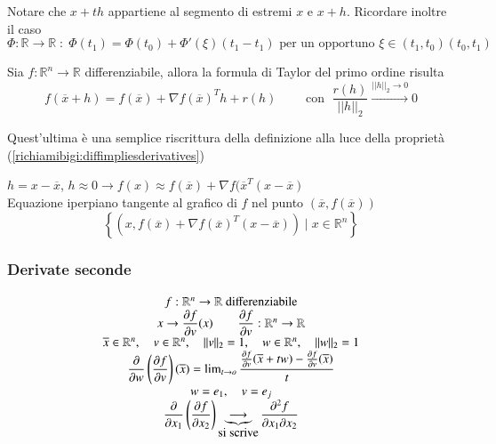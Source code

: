 \begin{notes}
Notare che $x + th$ appartiene al segmento di estremi $x$ e $x+h$.
Ricordare inoltre il caso
$$  \Phi : \mathbb{R} \rightarrow \mathbb{R}\; : \;
\Phi(t_1) = \Phi(t_0) +   \Phi'(\xi)(t_1 -t_1)
\text{ per un opportuno } \xi
\in (t_1, t_0)
(t_0,t_1) 
$$
\end{notes}

\begin{defn}
Sia $f:\mathbb{R}^{n} \rightarrow \mathbb{R}$ differenziabile, allora la formula
di Taylor del primo ordine risulta
$$ 
f(\overline{x} + h) =
 f(\overline{x}) + \nabla f (\overline{x})^T h + r(h)
\qquad \text{ con  }\; 
\dfrac{r(h)}{||h||_{2}} \xrightarrow{ || h ||_{2} \to 0} 0$$
\end{defn}
Quest'ultima \`e una semplice riscrittura della definizione
alla luce della propriet\`a (\ref{richiamibigi:diffimpliesderivatives}) 

\begin{defn}
$h = x - \overline{x}$, $h \approx 0  
\rightarrow f(x) \approx f(\overline{x})
 + \nabla f(\overline{x}^{T}(x - \overline{x})$
\\
Equazione iperpiano tangente al grafico di $f$ nel punto
 $(\overline{x}, f(\overline{x}))$
$$ \left\{ (x, f(\overline{x}) + \nabla f(\overline{x})^{T}(x-\overline{x})) 
\; | \; x \in \mathbb{R}^{n} \right\}$$
\end{defn}


\subsubsection{Derivate seconde}
$$
\begin{array}c
f:\mathbb{R}^n \to \mathbb{R} ~ \mbox{differenziabile}\\
x \to \dfrac{\partial f}{\partial v}(x) \qquad \dfrac{\partial f}{\partial v}: \mathbb{R}^n \to \mathbb{R}\\
\overline{x} \in \mathbb{R}^n, \quad v \in \mathbb{R}^n, \quad \Vert v \Vert_2 = 1, \quad w \in \mathbb{R}^n, \quad \Vert w \Vert_2 = 1\\
\dfrac{\partial}{\partial w}\left(\dfrac{\partial f}{\partial v} \right)(\overline{x}) = \lim_{t \to o}\dfrac{\frac{\partial f}{\partial v}(\overline{x} + tw)-\frac{\partial f}{\partial v}(\overline{x})}{t}\\
w = e_1, \quad v = e_j\\
\dfrac{\partial}{\partial x_1}\left(\dfrac{\partial f}{\partial x_2}\right) \underbrace{\longrightarrow}_{\mbox{si scrive}} \dfrac{\partial^2 f}{\partial x_1 \partial x_2}
\end{array}
$$  

